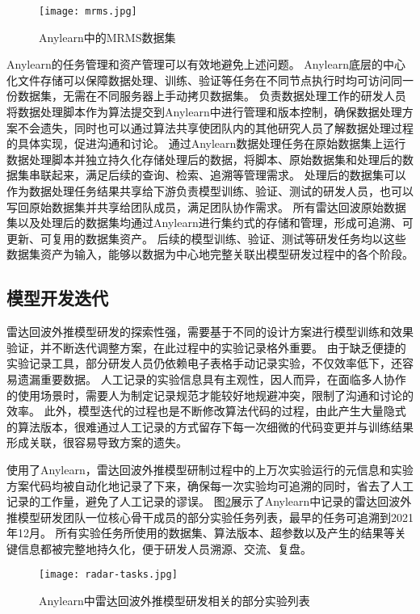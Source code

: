 \begin{figure}
  \centering
  \texttt{[image: mrms.jpg]}
  \caption{Anylearn中的MRMS数据集}
  \label{fig:mrms}
\end{figure}

Anylearn的任务管理和资产管理可以有效地避免上述问题。
Anylearn底层的中心化文件存储可以保障数据处理、训练、验证等任务在不同节点执行时均可访问同一份数据集，无需在不同服务器上手动拷贝数据集。
负责数据处理工作的研发人员将数据处理脚本作为算法提交到Anylearn中进行管理和版本控制，确保数据处理方案不会遗失，同时也可以通过算法共享使团队内的其他研究人员了解数据处理过程的具体实现，促进沟通和讨论。
通过Anylearn数据处理任务在原始数据集上运行数据处理脚本并独立持久化存储处理后的数据，将脚本、原始数据集和处理后的数据集串联起来，满足后续的查询、检索、追溯等管理需求。
处理后的数据集可以作为数据处理任务结果共享给下游负责模型训练、验证、测试的研发人员，也可以写回原始数据集并共享给团队成员，满足团队协作需求。
所有雷达回波原始数据集以及处理后的数据集均通过Anylearn进行集约式的存储和管理，形成可追溯、可更新、可复用的数据集资产。
后续的模型训练、验证、测试等研发任务均以这些数据集资产为输入，能够以数据为中心地完整关联出模型研发过程中的各个阶段。

\subsection{模型开发迭代}
雷达回波外推模型研发的探索性强，需要基于不同的设计方案进行模型训练和效果验证，并不断迭代调整方案，在此过程中的实验记录格外重要。
由于缺乏便捷的实验记录工具，部分研发人员仍依赖电子表格手动记录实验，不仅效率低下，还容易遗漏重要数据。
人工记录的实验信息具有主观性，因人而异，在面临多人协作的使用场景时，需要人为制定记录规范才能较好地规避冲突，限制了沟通和讨论的效率。
此外，模型迭代的过程也是不断修改算法代码的过程，由此产生大量隐式的算法版本，很难通过人工记录的方式留存下每一次细微的代码变更并与训练结果形成关联，很容易导致方案的遗失。

使用了Anylearn，雷达回波外推模型研制过程中的上万次实验运行的元信息和实验方案代码均被自动化地记录了下来，确保每一次实验均可追溯的同时，省去了人工记录的工作量，避免了人工记录的谬误。
图\ref{fig:radartasks}展示了Anylearn中记录的雷达回波外推模型研发团队一位核心骨干成员的部分实验任务列表，最早的任务可追溯到2021年12月。
所有实验任务所使用的数据集、算法版本、超参数以及产生的结果等关键信息都被完整地持久化，便于研发人员溯源、交流、复盘。

\begin{figure}
  \centering
  \texttt{[image: radar-tasks.jpg]}
  \caption{Anylearn中雷达回波外推模型研发相关的部分实验列表}
  \label{fig:radartasks}
\end{figure}

